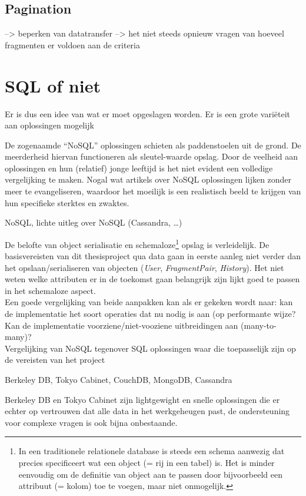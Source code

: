 \subsection{Pagination}

--> beperken van datatransfer
--> het niet steeds opnieuw vragen van hoeveel fragmenten er voldoen aan de criteria

\section{SQL of niet}
Er is dus een idee van wat er moet opgeslagen worden. Er is een grote vari\"eteit aan oplossingen mogelijk

De zogenaamde ``NoSQL'' oplossingen schieten als paddenstoelen uit de grond. De meerderheid hiervan functioneren als sleutel-waarde opslag. Door de veelheid aan oplossingen en hun (relatief) jonge leeftijd is het niet evident een volledige vergelijking te maken. Nogal wat artikels over NoSQL oplossingen lijken zonder meer te evangeliseren, waardoor het moeilijk is een realistisch beeld te krijgen van hun specifieke sterktes en zwaktes.

NoSQL, lichte uitleg over NoSQL (Cassandra, \ldots)

De belofte van object serialisatie en schemaloze\footnote{In een traditionele relationele database is steeds een schema aanwezig dat precies specificeert wat een object (= rij in een tabel) is. Het is minder eenvoudig om de definitie van object aan te passen door bijvoorbeeld een attribuut (= kolom) toe te voegen, maar niet onmogelijk.} opslag is verleidelijk. De basisvereisten van dit thesisproject qua data gaan in eerste aanleg niet verder dan het opslaan/serialiseren van objecten (\emph{User}, \emph{FragmentPair}, \emph{History}). Het niet weten welke attributen er in de toekomst gaan belangrijk zijn lijkt goed te passen in het schemaloze aspect.\\

Een goede vergelijking van beide aanpakken kan als er gekeken wordt naar: kan de implementatie het soort operaties dat nu nodig is aan (op performante wijze? Kan de implementatie voorziene/niet-vooziene uitbreidingen aan (many-to-many)?\\


Vergelijking van NoSQL tegenover SQL oplossingen waar die toepasselijk zijn op de vereisten van het project

Berkeley DB, Tokyo Cabinet, CouchDB, MongoDB, Cassandra

Berkeley DB en Tokyo Cabinet zijn lightgewight en snelle oplossingen die er echter op vertrouwen dat alle data in het werkgeheugen past, de ondersteuning voor complexe vragen is ook bijna onbestaande. 

